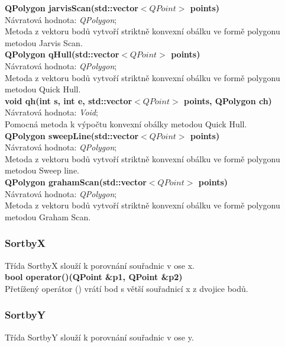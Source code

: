 \documentclass[a4paper, 12pt]{article}
\begin{document}
\textbf{QPolygon jarvisScan(std::vector$<QPoint>$ points)}\\
Návratová hodnota: \textit{QPolygon};\\
Metoda z vektoru bodů vytvoří striktně konvexní obálku ve formě polygonu metodou Jarvis Scan. 
\\

\textbf{QPolygon qHull(std::vector$<QPoint>$ points)}\\
Návratová hodnota: \textit{QPolygon};\\
Metoda z vektoru bodů vytvoří striktně konvexní obálku ve formě polygonu metodou Quick Hull. 
\\

\textbf{void qh(int s, int e, std::vector$<QPoint>$ points, QPolygon ch)}\\
Návratová hodnota: \textit{Void};\\
Pomocná metoda k výpočtu konvexní obálky metodou Quick Hull. 
\\

\textbf{QPolygon sweepLine(std::vector$<QPoint>$ points)}\\
Návratová hodnota: \textit{QPolygon};\\
Metoda z vektoru bodů vytvoří striktně konvexní obálku ve formě polygonu metodou Sweep line. 
\\

\textbf{QPolygon grahamScan(std::vector$<QPoint>$ points)}\\
Návratová hodnota: \textit{QPolygon};\\
Metoda z vektoru bodů vytvoří striktně konvexní obálku ve formě polygonu metodou Graham Scan. 
\\

\subsubsection{SortbyX}
Třída SortbyX slouží k porovnání souřadnic v ose x.\\


\textbf{bool operator()(QPoint \&p1, QPoint \&p2)}\\
Přetížený operátor () vrátí bod s větší souřadnicí x z dvojice bodů.\\


\subsubsection{SortbyY}
Třída SortbyY slouží k porovnání souřadnic v ose y.
\\
\end{document}
